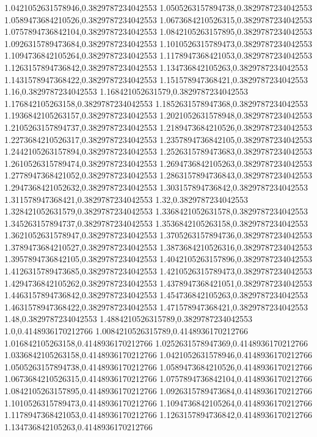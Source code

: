 1.0421052631578946,0.3829787234042553
1.0505263157894738,0.3829787234042553
1.0589473684210526,0.3829787234042553
1.0673684210526315,0.3829787234042553
1.0757894736842104,0.3829787234042553
1.0842105263157895,0.3829787234042553
1.0926315789473684,0.3829787234042553
1.1010526315789473,0.3829787234042553
1.1094736842105264,0.3829787234042553
1.1178947368421053,0.3829787234042553
1.1263157894736842,0.3829787234042553
1.134736842105263,0.3829787234042553
1.1431578947368422,0.3829787234042553
1.151578947368421,0.3829787234042553
1.16,0.3829787234042553
1.168421052631579,0.3829787234042553
1.176842105263158,0.3829787234042553
1.1852631578947368,0.3829787234042553
1.1936842105263157,0.3829787234042553
1.2021052631578948,0.3829787234042553
1.2105263157894737,0.3829787234042553
1.2189473684210526,0.3829787234042553
1.2273684210526317,0.3829787234042553
1.2357894736842105,0.3829787234042553
1.2442105263157894,0.3829787234042553
1.2526315789473683,0.3829787234042553
1.2610526315789474,0.3829787234042553
1.2694736842105263,0.3829787234042553
1.2778947368421052,0.3829787234042553
1.2863157894736843,0.3829787234042553
1.2947368421052632,0.3829787234042553
1.303157894736842,0.3829787234042553
1.311578947368421,0.3829787234042553
1.32,0.3829787234042553
1.328421052631579,0.3829787234042553
1.3368421052631578,0.3829787234042553
1.345263157894737,0.3829787234042553
1.3536842105263158,0.3829787234042553
1.3621052631578947,0.3829787234042553
1.3705263157894736,0.3829787234042553
1.3789473684210527,0.3829787234042553
1.3873684210526316,0.3829787234042553
1.3957894736842105,0.3829787234042553
1.4042105263157896,0.3829787234042553
1.4126315789473685,0.3829787234042553
1.4210526315789473,0.3829787234042553
1.4294736842105262,0.3829787234042553
1.4378947368421051,0.3829787234042553
1.4463157894736842,0.3829787234042553
1.454736842105263,0.3829787234042553
1.4631578947368422,0.3829787234042553
1.471578947368421,0.3829787234042553
1.48,0.3829787234042553
1.4884210526315789,0.3829787234042553
1.0,0.4148936170212766
1.0084210526315789,0.4148936170212766
1.016842105263158,0.4148936170212766
1.0252631578947369,0.4148936170212766
1.0336842105263158,0.4148936170212766
1.0421052631578946,0.4148936170212766
1.0505263157894738,0.4148936170212766
1.0589473684210526,0.4148936170212766
1.0673684210526315,0.4148936170212766
1.0757894736842104,0.4148936170212766
1.0842105263157895,0.4148936170212766
1.0926315789473684,0.4148936170212766
1.1010526315789473,0.4148936170212766
1.1094736842105264,0.4148936170212766
1.1178947368421053,0.4148936170212766
1.1263157894736842,0.4148936170212766
1.134736842105263,0.4148936170212766
